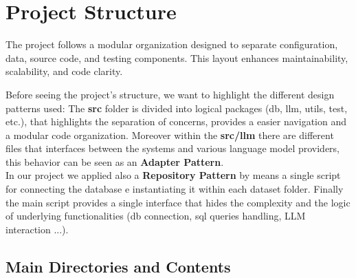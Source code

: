 \documentclass[12pt,a4paper]{article}
\begin{document}
\section{Project Structure}

The project follows a modular organization designed to separate configuration, data, source code, and testing components.  
This layout enhances maintainability, scalability, and code clarity.

Before seeing the project's structure, we want to highlight the different design patterns used: 
The \textbf{src} folder is divided into logical packages (db, llm, utils, test, etc.), that highlights the separation of concerns, provides a easier navigation and a modular code organization.
Moreover within the \textbf{src/llm} there are different files that interfaces between the systems and various language model providers, this behavior can be seen as an  \textbf{Adapter Pattern}.\\
In our project we applied also  a \textbf{Repository Pattern} by means a single script for connecting the database e instantiating it within each dataset folder.
Finally the main script provides a single interface that hides the complexity and the logic of underlying functionalities (db connection, sql queries handling, LLM interaction ...). 

\subsection{Main Directories and Contents}
\end{document}
